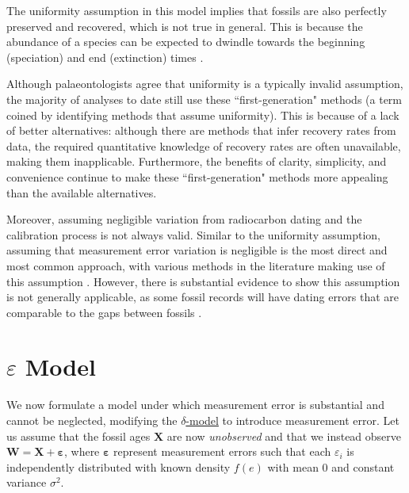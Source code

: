 The uniformity assumption in this model implies that fossils are also perfectly preserved and recovered, which is not true in general. This is because the abundance of a species can be expected to dwindle towards the beginning (speciation) and end (extinction) times \cite{Lee2010, WangMarshall2016}.

Although palaeontologists agree that uniformity is a typically invalid assumption, the majority of analyses to date still use these ``first-generation" methods (a term coined by \citet{WangMarshall2016} identifying methods that assume uniformity). This is because of a lack of better alternatives: although there are methods that infer recovery rates from data, the required quantitative knowledge of recovery rates are often unavailable, making them inapplicable. Furthermore, the benefits of clarity, simplicity, and convenience continue to make these ``first-generation" methods more appealing than the available alternatives.

Moreover, assuming negligible variation from radiocarbon dating and the calibration process is not always valid. Similar to the uniformity assumption, assuming that measurement error variation is negligible is the most direct and most common approach, with various methods in the literature making use of this assumption \cite{Mcinerny2006, Solow1993, Strauss1989, Wang2016, Weiss1999}. However, there is substantial evidence to show this assumption is not generally applicable, as some fossil records will have dating errors that are comparable to the gaps between fossils \cite{Solow2006}.

\clearpage

\section{$\varepsilon$ Model}\label{section: varepsilon-model}

We now formulate a model under which measurement error is substantial and cannot be neglected, modifying the \hyperref[model: no-measurement-error]{$\delta$-model} to introduce measurement error. Let us assume that the fossil ages $\bm{X}$ are now \textit{unobserved} and that we instead observe $\bm{W} = \bm{X} + \bm{\varepsilon}$, where $\bm{\varepsilon}$ represent measurement errors such that each $\varepsilon_i$ is independently distributed with known density $f(e)$ with mean 0 and constant variance $\sigma^2$.

